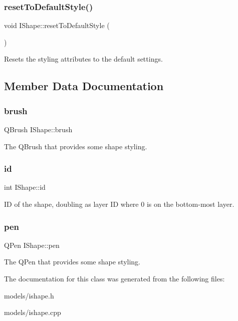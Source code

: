 \mbox{\label{class_i_shape_a3f1e70475296c2e897df28a7facb5bad}} 
\subsubsection{\texorpdfstring{resetToDefaultStyle()}{resetToDefaultStyle()}}
{\footnotesize\ttfamily void I\+Shape\+::reset\+To\+Default\+Style (\begin{DoxyParamCaption}{ }\end{DoxyParamCaption})}



Resets the styling attributes to the default settings. 



\subsection{Member Data Documentation}
\mbox{\label{class_i_shape_a3827e9f0c3c88331ceaa3bb9b00f7073}} 
\subsubsection{\texorpdfstring{brush}{brush}}
{\footnotesize\ttfamily Q\+Brush I\+Shape\+::brush}

The Q\+Brush that provides some shape styling. \mbox{\label{class_i_shape_a6ff2d631831c1079b88eeebc8ac65bb0}} 
\subsubsection{\texorpdfstring{id}{id}}
{\footnotesize\ttfamily int I\+Shape\+::id}

ID of the shape, doubling as layer ID where 0 is on the bottom-\/most layer. \mbox{\label{class_i_shape_ab185a01c9703b4db801b54030031a9c6}} 
\subsubsection{\texorpdfstring{pen}{pen}}
{\footnotesize\ttfamily Q\+Pen I\+Shape\+::pen}

The Q\+Pen that provides some shape styling. 

The documentation for this class was generated from the following files\+:\begin{DoxyCompactItemize}
\item 
models/ishape.\+h\item 
models/ishape.\+cpp\end{DoxyCompactItemize}
